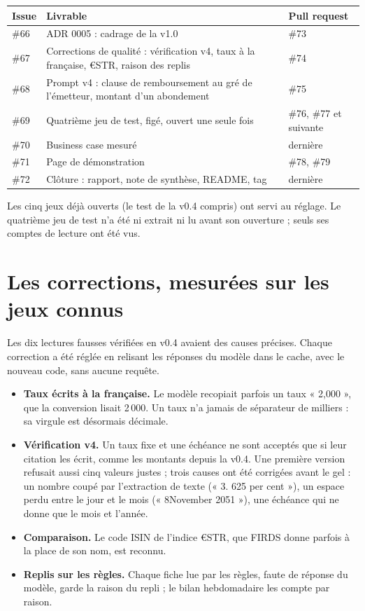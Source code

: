 \documentclass[11pt,a4paper]{article}
\begin{document}
\begin{table}[H]
\small
\begin{tabularx}{\linewidth}{lYl}
\toprule
\textbf{Issue} & \textbf{Livrable} & \textbf{Pull request} \\
\midrule
\#66 & ADR 0005 : cadrage de la v1.0 & \#73 \\
\#67 & Corrections de qualité : vérification v4, taux à la française, €STR, raison des replis & \#74 \\
\#68 & Prompt v4 : clause de remboursement au gré de l'émetteur, montant d'un abondement & \#75 \\
\#69 & Quatrième jeu de test, figé, ouvert une seule fois & \#76, \#77 et suivante \\
\#70 & Business case mesuré & dernière \\
\#71 & Page de démonstration & \#78, \#79 \\
\#72 & Clôture : rapport, note de synthèse, README, tag & dernière \\
\bottomrule
\end{tabularx}
\end{table}

Les cinq jeux déjà ouverts (le test de la v0.4 compris) ont servi au réglage. Le quatrième jeu de test n'a été ni extrait ni lu avant son ouverture ; seuls ses comptes de lecture ont été vus.

\section{Les corrections, mesurées sur les jeux connus}

Les dix lectures fausses vérifiées en v0.4 avaient des causes précises. Chaque correction a été réglée en relisant les réponses du modèle dans le cache, avec le nouveau code, sans aucune requête.

\begin{itemize}
  \item \textbf{Taux écrits à la française.} Le modèle recopiait parfois un taux « 2,000 », que la conversion lisait 2\,000. Un taux n'a jamais de séparateur de milliers : sa virgule est désormais décimale.
  \item \textbf{Vérification v4.} Un taux fixe et une échéance ne sont acceptés que si leur citation les écrit, comme les montants depuis la v0.4. Une première version refusait aussi cinq valeurs justes ; trois causes ont été corrigées avant le gel : un nombre coupé par l'extraction de texte (« 3. 625 per cent »), un espace perdu entre le jour et le mois (« 8November 2051 »), une échéance qui ne donne que le mois et l'année.
  \item \textbf{Comparaison.} Le code ISIN de l'indice €STR, que FIRDS donne parfois à la place de son nom, est reconnu.
  \item \textbf{Replis sur les règles.} Chaque fiche lue par les règles, faute de réponse du modèle, garde la raison du repli ; le bilan hebdomadaire les compte par raison.
\end{itemize}
\end{document}

